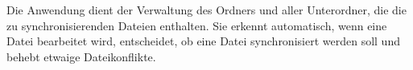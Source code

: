 Die Anwendung \sblit dient der Verwaltung des Ordners und aller Unterordner, die die zu synchronisierenden Dateien enthalten. Sie erkennt automatisch, wenn eine Datei bearbeitet wird, entscheidet, ob eine Datei synchronisiert werden soll und behebt etwaige Dateikonflikte. 